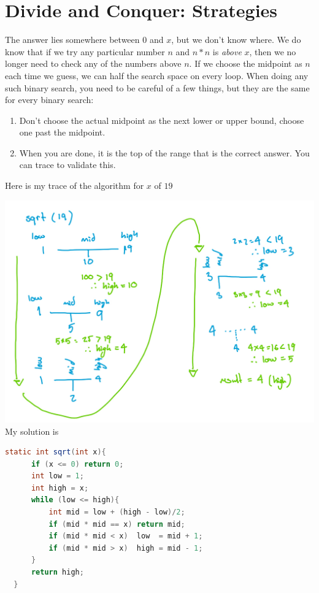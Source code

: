 \documentclass[twoside=false,DIV=14]{scrartcl}
\begin{document}
\section{Divide and Conquer: Strategies}
The answer lies somewhere between $0$ and $x$, but we don't know where.  We do know that if we try any particular number $n$ and $n*n$ is \emph{above} $x$, then we no longer need to check any of the numbers above $n$.  If we choose the midpoint as $n$ each time we guess, we can half the search space on every loop.  When doing any such binary search, you need to be careful of a few things, but they are the same for every binary search:
\begin{enumerate}
\item Don't choose the actual midpoint as the next lower or upper bound, choose one past the midpoint.
\item When you are done, it is the top of the range that is the correct answer.  You can trace to validate this.
\end{enumerate}

Here is my trace of the algorithm for $x$ of $19$

\includegraphics[width=\textwidth]{binary_search_trace.jpeg}
My solution is 

\begin{lstlisting}[language=java]
static int sqrt(int x){
      if (x <= 0) return 0;
      int low = 1;
      int high = x;
      while (low <= high){
          int mid = low + (high - low)/2;
          if (mid * mid == x) return mid;
          if (mid * mid < x)  low  = mid + 1;
          if (mid * mid > x)  high = mid - 1;
      }
      return high;
  }
\end{lstlisting}
\end{document}
